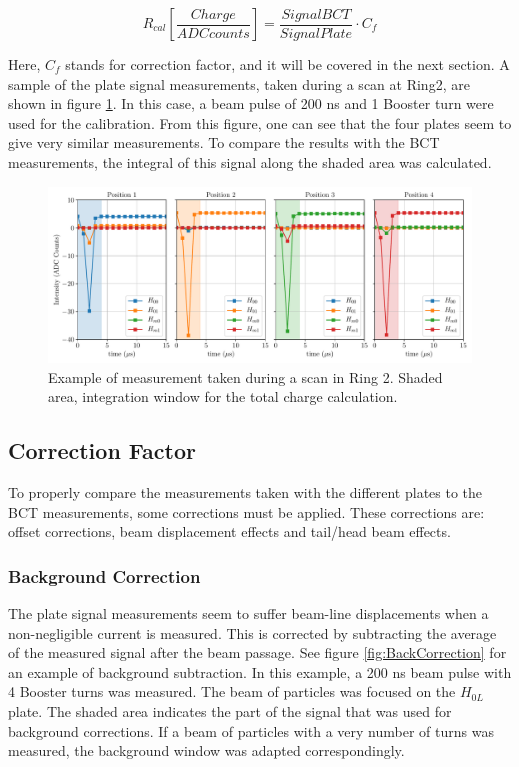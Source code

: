 \begin{equation}
    R_{cal}\left[\frac{Charge}{ADCcounts}\right] = \frac{Signal BCT}{Signal Plate}\cdot C_{f}
\end{equation}

Here, $C_f$ stands for correction factor, and it will be covered in the next section. A sample of the plate signal measurements, taken during a scan at Ring2, are shown in figure \ref{fig:PlateSignalExample}. In this case, a beam pulse of 200 ns and 1 Booster turn were used for the calibration. From this figure, one can see that the four plates seem to give very similar measurements. To compare the results with the BCT measurements, the integral of this signal along the shaded area was calculated.  

\begin{figure}[h]
    \centering
    \includegraphics[width=1.0\columnwidth]{Figure_ExampleCalCalculation/ExampleScan.pdf}
    \caption{Example of measurement taken during a scan in Ring 2. Shaded area, integration window for the total charge calculation. }
    \label{fig:PlateSignalExample}
\end{figure}

\subsection{Correction Factor}

To properly compare the measurements taken with the different plates to the BCT measurements, some corrections must be applied. These corrections are: offset corrections, beam displacement effects and tail/head beam effects. 

\subsubsection{Background Correction}

The plate signal measurements seem to suffer beam-line displacements when a non-negligible current is measured. This is corrected by subtracting the average of the measured signal after the beam passage. See figure \ref{fig:BackCorrection} for an example of background subtraction. In this example, a 200 ns beam pulse with 4 Booster turns was measured. The beam of particles was focused on the $H_{0L}$ plate. The shaded area indicates the part of the signal that was used for background corrections. If a beam of particles with a very number of turns was measured, the background window was adapted correspondingly. 

